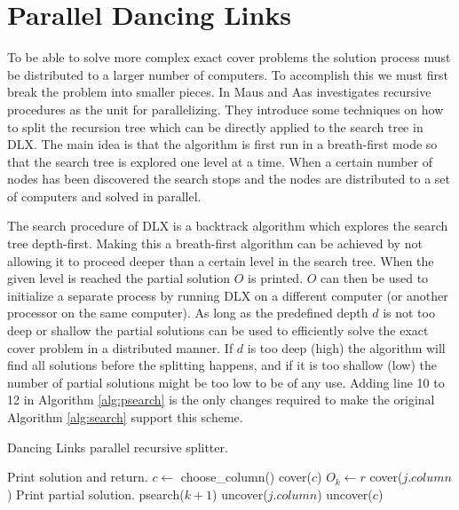 \section{Parallel Dancing Links}

To be able to solve more complex exact cover problems the solution process must be distributed to a larger number of computers.
To accomplish this we must first break the problem into smaller pieces.
In \cite{maus-prp} Maus and Aas investigates recursive procedures as the unit for parallelizing.
They introduce some techniques on how to split the recursion tree which can be directly applied to the search tree in DLX.
The main idea is that the algorithm is first run in a breath-first mode so that the search tree is explored one level at a time.
When a certain number of nodes has been discovered the search stops and the nodes are distributed to a set of computers and solved in parallel.

The search procedure of DLX is a backtrack algorithm which explores the search tree depth-first.
Making this a breath-first algorithm can be achieved by not allowing it to proceed deeper than a certain level in the search tree.
When the given level is reached the partial solution $O$ is printed.
$O$ can then be used to initialize a separate process by running DLX on a different computer (or another processor on the same computer).
As long as the predefined depth $d$ is not too deep or shallow the partial solutions can be used to efficiently solve the exact cover problem in a distributed manner.
If $d$ is too deep (high) the algorithm will find all solutions before the splitting happens, and if it is too shallow (low) the number of partial solutions might be too low to be of any use.
Adding line 10 to 12 in Algorithm \ref{alg:psearch} is the only changes required to make the original Algorithm \ref{alg:search} support this scheme.
\begin{algorithm}[htbp]
	\caption{Dancing Links parallel recursive splitter.}
	\label{alg:psearch}
	\begin{distribalgo}[1]
				\STATE Print solution and return.  
			\ENDIF
			\STATE $c \leftarrow$ choose\_column()
			\STATE cover($c$)
				\STATE $O_k \leftarrow r$  
					\STATE cover($j.column$)
				\ENDFOR
					\STATE Print partial solution.  
				\ELSE
					\STATE psearch($k + 1$)
				\ENDIF
					\STATE uncover($j.column$)
				\ENDFOR
			\ENDFOR
			\STATE uncover($c$)
		\ENDPROC
	\end{distribalgo}
\end{algorithm}

